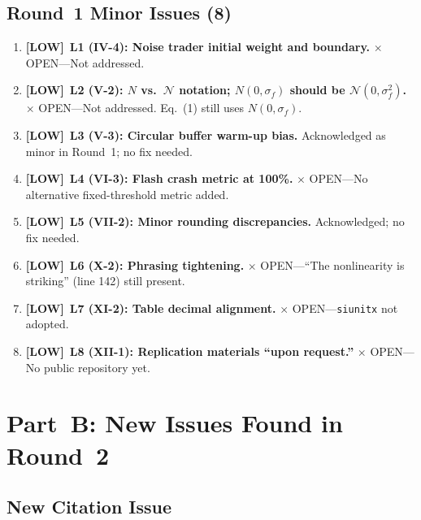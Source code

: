 \documentclass[12pt,a4paper]{article}
\newcommand{\LOW}{\textbf{\textcolor{okgreen}{[LOW]}}}
\newcommand{\OPEN}{\textcolor{errorred}{$\times$ OPEN}}
\begin{document}
\medskip

\subsection*{Round~1 Minor Issues (8)}

\begin{enumerate}

\item \LOW\ \textbf{L1 (IV-4): Noise trader initial weight and boundary.} \OPEN---Not addressed.

\item \LOW\ \textbf{L2 (V-2): $N$ vs.\ $\mathcal{N}$ notation; $N(0,\sigma_f)$ should be $\mathcal{N}(0,\sigma_f^2)$.} \OPEN---Not addressed. Eq.~(1) still uses $N(0, \sigma_f)$.

\item \LOW\ \textbf{L3 (V-3): Circular buffer warm-up bias.} Acknowledged as minor in Round~1; no fix needed.

\item \LOW\ \textbf{L4 (VI-3): Flash crash metric at 100\%.} \OPEN---No alternative fixed-threshold metric added.

\item \LOW\ \textbf{L5 (VII-2): Minor rounding discrepancies.} Acknowledged; no fix needed.

\item \LOW\ \textbf{L6 (X-2): Phrasing tightening.} \OPEN---``The nonlinearity is striking'' (line 142) still present.

\item \LOW\ \textbf{L7 (XI-2): Table decimal alignment.} \OPEN---\texttt{siunitx} not adopted.

\item \LOW\ \textbf{L8 (XII-1): Replication materials ``upon request.''} \OPEN---No public repository yet.

\end{enumerate}


\section*{Part~B: New Issues Found in Round~2}

\subsection*{New Citation Issue}
\end{document}

